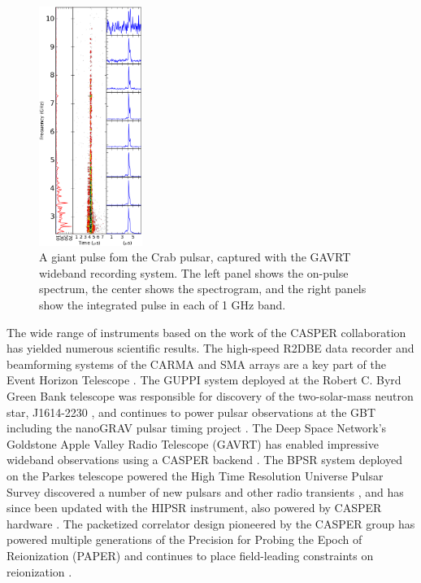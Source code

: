 \documentclass{ws-jai}
\begin{document}
\begin{figure}[ht]
 \centering
 \includegraphics[width=0.3\textwidth]{./figures/pulse_0033_8us_cleaned_up.png}
 \caption{A giant pulse fom the Crab pulsar, captured with the GAVRT wideband recording system. The left panel shows the on-pulse spectrum, the center shows the spectrogram, and the right panels show the integrated pulse in each of 1 GHz band.}
 \label{fig:crab-wide}
\end{figure}

The wide range of instruments based on the work of the CASPER collaboration has yielded numerous scientific results. The high-speed R2DBE data recorder \citep{r2dbe} and beamforming systems of the CARMA and SMA arrays are a key part of the Event Horizon Telescope \citep{eht1, eht2}. The GUPPI system deployed at the Robert C. Byrd Green Bank telescope was responsible for discovery of the two-solar-mass neutron star, J1614-2230 \citep{neutron-star}, and continues to power pulsar observations at the GBT including the nanoGRAV pulsar timing project \citep{nanograv}. The Deep Space Network's Goldstone Apple Valley Radio Telescope (GAVRT) has enabled impressive wideband observations using a CASPER backend \citep[Figure~\ref{fig:crab-wide}]{crab-wide}. The BPSR system deployed on the Parkes telescope powered the High Time Resolution Universe Pulsar Survey discovered a number of new pulsars and other radio transients \citep[for example]{keith2010high, bates2011high, pop-frbs}, and has since been updated with the HIPSR instrument, also powered by CASPER hardware \citep{hipsr}.
The packetized correlator design pioneered by the CASPER group \citep{parsons2008scalable} has powered multiple generations of the Precision for Probing the Epoch of Reionization (PAPER) and continues to place field-leading constraints on reionization \citep{paper64a, paper64b}.
\end{document}
